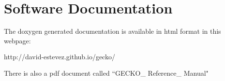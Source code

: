 \section{Software Documentation}
The doxygen generated documentation is available in html format in this webpage: \\
\begin{center}
http://david-estevez.github.io/gecko/
\end{center}

\vspace{0.5cm}\hspace{-0.65cm}
There is also a pdf document called ``GECKO\_ Reference\_ Manual"
\newpage
